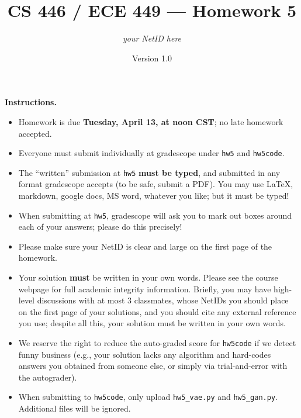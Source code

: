 \documentclass{article}
\title{CS 446 / ECE 449 --- Homework 5}
\author{\emph{your NetID here}}
\date{Version 1.0}
\theoremstyle{definition}
\theoremstyle{remark}
\begin{document}
        \maketitle

        \noindent\textbf{Instructions.}
        \begin{itemize}
          \item
            Homework is due \textbf{Tuesday, April 13, at noon CST}; no late homework accepted.
        
          \item
            Everyone must submit individually at gradescope under \texttt{hw5} and \texttt{hw5code}.
        
          \item
            The ``written'' submission at \texttt{hw5} \textbf{must be typed}, and submitted in
            any format gradescope accepts (to be safe, submit a PDF).  You may use \LaTeX, markdown,
            google docs, MS word, whatever you like; but it must be typed!
        
          \item
            When submitting at \texttt{hw5}, gradescope will ask you to mark out boxes
            around each of your answers; please do this precisely!
        
          \item
            Please make sure your NetID is clear and large on the first page of the homework.
        
          \item
            Your solution \textbf{must} be written in your own words.
            Please see the course webpage for full academic integrity information.
            Briefly, you may have high-level discussions with at most 3 classmates,
            whose NetIDs you should place on the first page of your solutions,
            and you should cite any external reference you use; despite all this,
            your solution must be written in your own words.
        
          \item
            We reserve the right to reduce the auto-graded score for
            \texttt{hw5code} if we detect funny business (e.g., your solution
            lacks any algorithm and hard-codes answers you obtained from
            someone else, or simply via trial-and-error with the autograder).
            
          \item
           When submitting to \texttt{hw5code}, only upload \texttt{hw5\_vae.py} and \texttt{hw5\_gan.py}. Additional files will be ignored.
        
        \end{itemize}
        
       
       \begin{enumerate}[font={\Large\bfseries},left=0pt]
	               
       
                
	    
	           
	   
	           
 
    \end{enumerate}
\end{document}
